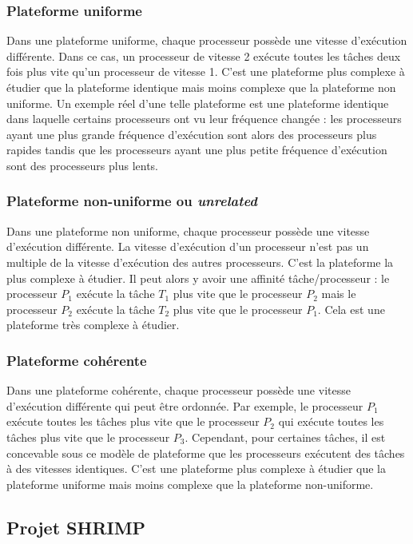 \subsubsection{Plateforme uniforme}
Dans une plateforme uniforme, chaque processeur possède une vitesse d'exécution différente. Dans ce cas, un processeur de vitesse 2 exécute toutes les tâches deux fois plus vite qu'un processeur de vitesse 1. C'est une plateforme plus complexe à étudier que la plateforme identique mais moins complexe que la plateforme non uniforme. Un exemple réel d'une telle plateforme est une plateforme identique dans laquelle certains processeurs ont vu leur fréquence changée : les processeurs ayant une plus grande fréquence d'exécution sont alors des processeurs plus rapides tandis que les processeurs ayant une plus petite fréquence d'exécution sont des processeurs plus lents. 

\subsubsection{Plateforme non-uniforme ou \textit{unrelated}}
Dans une plateforme non uniforme, chaque processeur possède une vitesse d'exécution différente. La vitesse d'exécution d'un processeur n'est pas un multiple de la vitesse d'exécution des autres processeurs. C'est la plateforme la plus complexe à étudier. Il peut alors y avoir une affinité tâche/processeur : le processeur $P_1$ exécute la tâche $T_1$ plus vite que le processeur $P_2$ mais le processeur $P_2$ exécute la tâche $T_2$ plus vite que le processeur $P_1$. Cela est une plateforme très complexe à étudier.

\subsubsection{Plateforme cohérente}
Dans une plateforme cohérente, chaque processeur possède une vitesse d'exécution différente qui peut être ordonnée. Par exemple, le processeur $P_1$ exécute toutes les tâches plus vite que le processeur $P_2$ qui exécute toutes les tâches plus vite que le processeur $P_3$. Cependant, pour certaines tâches, il est concevable sous ce modèle de plateforme que les processeurs exécutent des tâches à des vitesses identiques. C'est une plateforme plus complexe à étudier que la plateforme uniforme mais moins complexe que la plateforme non-uniforme.

\subsection{Projet SHRIMP}

